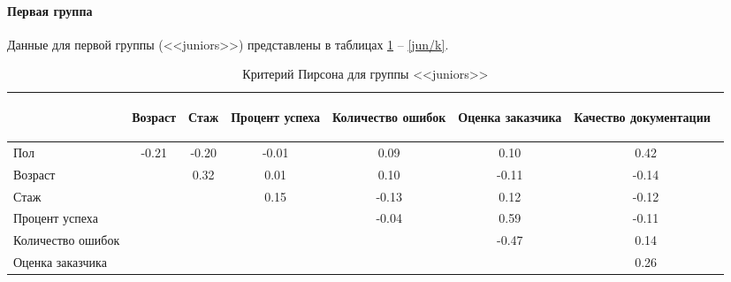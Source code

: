 \paragraph{Первая группа}
Данные для первой группы (<<juniors>>) представлены в таблицах \ref{jun/p} -- \ref{jun/k}.

\begin{table}[H]
	\centering
	\caption{Критерий Пирсона для группы <<juniors>>}
	\begin{tabular}{|l|c|c|c|c|c|c|}
		\hline
		&  
		\begin{sideways}
			Возраст
		\end{sideways}  & 
		\begin{sideways}
			Стаж
		\end{sideways} & 
		\begin{sideways}
			Процент успеха
		\end{sideways} & 
		\begin{sideways}
			Количество ошибок
		\end{sideways} &
		\begin{sideways}
			Оценка заказчика
		\end{sideways} & 
		\begin{sideways}
			Качество документации~
		\end{sideways} \\ \hline
		Пол                   & -0.21 & -0.20 & -0.01 & 0.09 & 0.10 & 0.42 \\ \hline
		Возраст               && 0.32 & 0.01 & 0.10 & -0.11 & -0.14 \\\hline
		Стаж                  &&&  0.15 & -0.13 &  0.12 & -0.12 \\ \hline
		Процент успеха        &&&& -0.04 &  0.59 & -0.11 \\ \hline
		Количество ошибок     &&&&& -0.47 &  0.14 \\ \hline
		Оценка заказчика      &&&&&&  0.26 \\ \hline
	\end{tabular}
	\label{jun/p}
\end{table}

